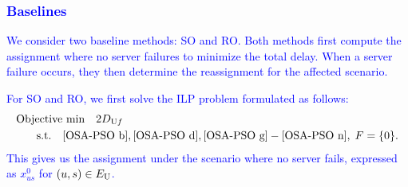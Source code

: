 \documentclass[10pt, letterpaper]{IEEEtran}
\newcommand\blue[1]{\textcolor{blue}{#1}}
\begin{document}
\begin{CJK}{UTF8}{ipxm}
\subsubsection{\blue{Baselines}}
\blue{
We consider two baseline methods: SO and RO.
Both methods first compute the assignment where no server failures to minimize the total delay.
When a server failure occurs, they then determine the reassignment for the affected scenario.
}

\blue{
For SO and RO, we first solve the ILP problem formulated as follows:
\begin{subequations} \label{OSA-SO-f0}
  \begin{align}
  \text{Objective}&\text{ min}\quad 2D_{\mathrm{U}f} \label{OSA-SO-f0 a} \\
  \rm{s.t.} \quad
  & \eqref{OSA-PSO b}, \eqref{OSA-PSO d}, \eqref{OSA-PSO g}-\eqref{OSA-PSO n}, \; F = \{0\}. \label{OSA-SO-f0 b}
  \end{align}
\end{subequations}
This gives us the assignment under the scenario where no server fails, expressed as $x^0_{us}$ for $(u,s) \in E_{\rm{U}}$.
}


\end{CJK}
\end{document}

